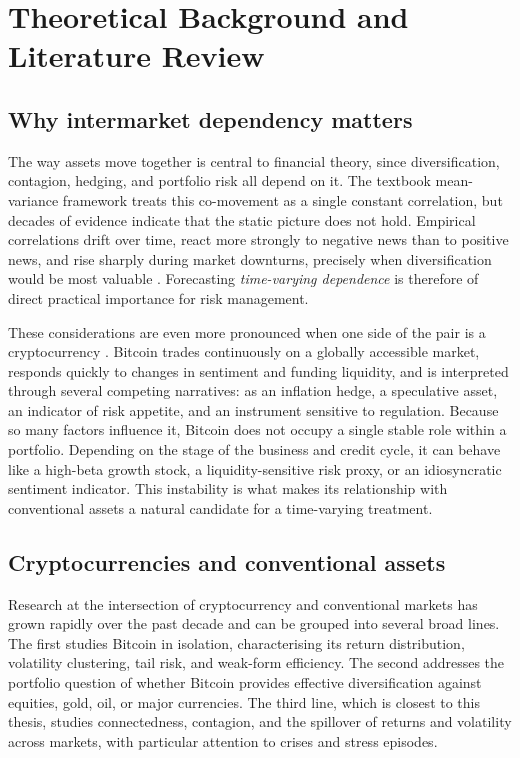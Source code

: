\section{Theoretical Background and Literature Review}

\subsection{Why intermarket dependency matters}

The way assets move together is central to financial theory, since diversification, contagion, hedging, and portfolio risk all depend on it. The textbook mean-variance framework treats this co-movement as a single constant correlation, but decades of evidence indicate that the static picture does not hold. Empirical correlations drift over time, react more strongly to negative news than to positive news, and rise sharply during market downturns, precisely when diversification would be most valuable \cite{longin2001}. Forecasting \emph{time-varying dependence} is therefore of direct practical importance for risk management.

These considerations are even more pronounced when one side of the pair is a cryptocurrency \cite{nakamoto2008bitcoin}. Bitcoin trades continuously on a globally accessible market, responds quickly to changes in sentiment and funding liquidity, and is interpreted through several competing narratives: as an inflation hedge, a speculative asset, an indicator of risk appetite, and an instrument sensitive to regulation. Because so many factors influence it, Bitcoin does not occupy a single stable role within a portfolio. Depending on the stage of the business and credit cycle, it can behave like a high-beta growth stock, a liquidity-sensitive risk proxy, or an idiosyncratic sentiment indicator. This instability is what makes its relationship with conventional assets a natural candidate for a time-varying treatment.

\subsection{Cryptocurrencies and conventional assets}

Research at the intersection of cryptocurrency and conventional markets has grown rapidly over the past decade and can be grouped into several broad lines. The first studies Bitcoin in isolation, characterising its return distribution, volatility clustering, tail risk, and weak-form efficiency. The second addresses the portfolio question of whether Bitcoin provides effective diversification against equities, gold, oil, or major currencies. The third line, which is closest to this thesis, studies connectedness, contagion, and the spillover of returns and volatility across markets, with particular attention to crises and stress episodes.


